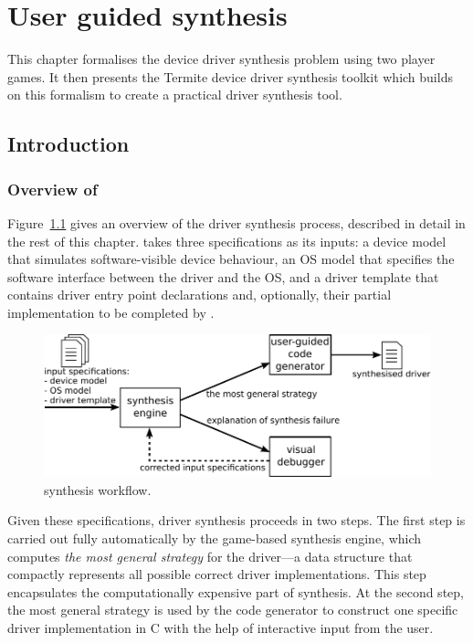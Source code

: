 \chapter{User guided synthesis}
\label{ch:userguided}

This chapter formalises the device driver synthesis problem using two player games. It then presents the Termite device driver synthesis toolkit which builds on this formalism to create a practical driver synthesis tool.

\section{Introduction}\label{sec:user_guided_intro}

\subsection{Overview of \termite} Figure~\ref{f:termite} gives an overview of the driver synthesis process, described in detail in the rest of this chapter.  \termite takes three specifications as its inputs: a device model that simulates software-visible device behaviour, an OS model that specifies the software interface between the driver and the OS, and a driver template that contains driver entry point declarations and, optionally, their partial implementation to be completed by \termite.

\begin{figure}
    \center
    \includegraphics[width=\linewidth]{imgs/termite.pdf}
    \caption{\termite synthesis workflow.}\label{f:termite}
\end{figure}

Given these specifications, driver synthesis proceeds in two steps.  The first step is carried out fully automatically by the \termite game-based synthesis engine, which computes \emph{the most general strategy} for the driver---a data structure that compactly represents all possible correct driver implementations.  This step encapsulates the computationally expensive part of synthesis.  At the second step, the most general strategy is used by the \termite code generator to construct one specific driver implementation in C with the help of interactive input from the user.

